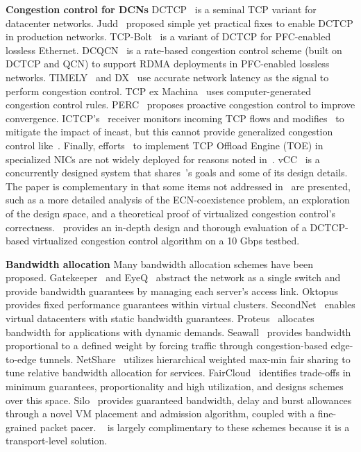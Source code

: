 {\bf Congestion control for DCNs}
DCTCP~\cite{dctcp} is a seminal TCP variant for datacenter networks.
Judd~\cite{judd2015nsdi} proposed simple yet practical fixes to enable DCTCP in production networks.
TCP-Bolt~\cite{stephens2014practical} is a variant of DCTCP for PFC-enabled lossless Ethernet.
DCQCN~\cite{zhu2015congestion} is a rate-based congestion control scheme (built on DCTCP and QCN) to
support RDMA deployments in PFC-enabled lossless networks.
TIMELY~\cite{mittal2015timely} and DX~\cite{lee2015accurate}
use accurate network latency as the signal to perform congestion control.
TCP ex Machina~\cite{winstein2013tcp} uses computer-generated congestion control rules.
PERC~\cite{jose2015high} proposes proactive congestion control to improve convergence.
ICTCP's~\cite{wu2010ictcp} receiver monitors incoming TCP flows and
modifies~\rwnd{} to mitigate the impact of incast, but this cannot
provide generalized congestion control like~\acdc{}.
Finally, efforts~\cite{dell-toe,chelsio-toe} to
implement TCP Offload Engine (TOE) in specialized NICs are not widely deployed for reasons noted in~\cite{mogul2003tcp,linux-toe}.
vCC~\cite{vcc} is a concurrently designed system that shares~\acdc{}'s goals and some of its design details.
The paper is complementary in that some items not addressed in~\acdc{} are presented, such as a more detailed
analysis of the ECN-coexistence problem, an exploration of the design space, and a theoretical proof of
virtualized congestion control's correctness.~\acdc{} provides an in-depth design and thorough evaluation of
a DCTCP-based virtualized congestion control algorithm on a 10 Gbps testbed.


{\bf Bandwidth allocation} Many bandwidth allocation schemes have been proposed.
Gatekeeper~\cite{rodrigues2011gatekeeper} and EyeQ~\cite{jeyakumar2013eyeq} abstract the network as a single
switch and provide bandwidth guarantees by managing each server's access link.
Oktopus~\cite{Ballani2011oktopus} provides fixed performance guarantees within virtual clusters.
SecondNet~\cite{Guo2010Secondnet} enables virtual datacenters with static bandwidth guarantees.
Proteus~\cite{Xie2012Proteus} allocates bandwidth for applications with dynamic demands.
Seawall~\cite{shieh2011sharing} provides bandwidth proportional to a defined weight by
forcing traffic through congestion-based edge-to-edge tunnels.
NetShare~\cite{Lam2012NetShare} utilizes hierarchical weighted max-min fair sharing to tune relative bandwidth allocation for services.
FairCloud~\cite{Popa2012Faircloud} identifies trade-offs in minimum
guarantees, proportionality and high utilization, and designs schemes over this space.
Silo~\cite{jang2015silo} provides guaranteed bandwidth, delay and burst allowances through a novel VM placement and admission
algorithm, coupled with a fine-grained packet pacer. 
~\acdc{} is largely complimentary to these schemes because it is a transport-level solution.

